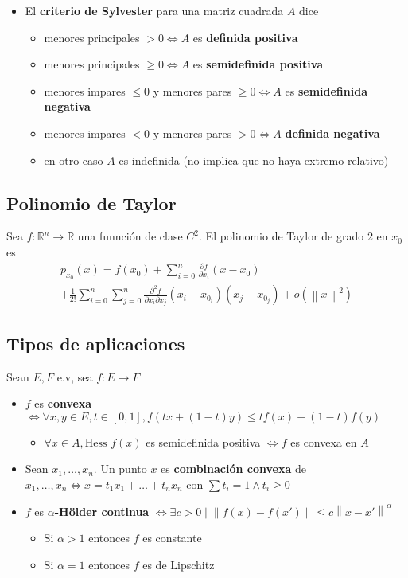 \documentclass[a4paper,twocolumn]{extarticle}
\newcommand{\R}{\mathbb{R}}
\newcommand{\norma}[1]{\left\lVert#1\right\rVert}
\newcommand{\hess}{\text{Hess }}
\begin{document}
\begin{itemize}
\begin{itemize}
	\end{itemize}
	\item El \textbf{criterio de Sylvester} para una matriz cuadrada $A$ dice
	\begin{itemize}
		\item menores principales $> 0 \iff A$ es \textbf{definida positiva}
		\item menores principales $\geq 0 \iff A$ es \textbf{semidefinida positiva}
		\item menores impares $\leq 0$ y menores pares $\geq 0 \iff A$ es \textbf{semidefinida negativa}
		\item menores impares $< 0$ y menores pares $> 0 \iff A$ \textbf{definida negativa}
		\item en otro caso $A$ es indefinida (no implica que no haya extremo relativo)
	\end{itemize}
\end{itemize}

\subsection{Polinomio de Taylor}

Sea $f:\R^n \to \R$ una funnción de clase $C^2$. El polinomio de Taylor de grado 2 en $x_0$ es
\begin{multline*}
	p_{x_0}(x) = f(x_0) + \sum_{i=0}^n \frac{\partial f}{\partial x_i}(x - x_0)\\
	+ \frac{1}{2!}\sum_{i=0}^n\sum_{j=0}^n \frac{\partial^2 f}{\partial x_i\partial x_j}(x_i - x_{0_i})(x_j - x_{0_j}) + o(\norma{x}^2)
\end{multline*}

\subsection{Tipos de aplicaciones}

Sean $E,F$ e.v, sea $f: E \to F$
\begin{itemize}
	\item $f$ es \textbf{convexa} $\iff \forall x,y \in E, t \in [0,1], f(tx + (1-t)y) \leq tf(x) + (1-t)f(y)$
	\begin{itemize}
		\item $\forall x \in A, \hess f (x)$ es semidefinida positiva $\iff f$ es convexa en $A$
	\end{itemize}
	\item Sean $x_1, \dots, x_n$. Un punto $x$ es \textbf{combinación convexa} de $x_1, \dots, x_n \iff x = t_1x_1 + \dots + t_nx_n$ con $\sum t_i = 1 \land t_i \geq 0$
	\item $f$ es $\alpha$\textbf{-Hölder continua} $\iff \exists c > 0 \mid \norma{f(x) - f(x')} \leq c \norma{x - x'}^\alpha$
	\begin{itemize}
		\item Si $\alpha > 1$ entonces $f$ es constante
		\item Si $\alpha = 1$ entonces $f$ es de Lipschitz
	\end{itemize}
\end{itemize}
\end{document}
